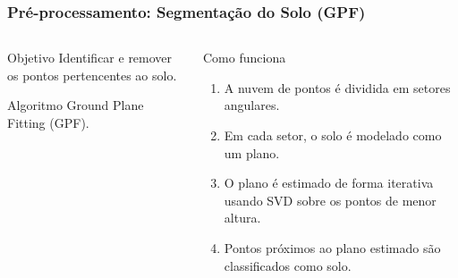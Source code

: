 \documentclass[aspectratio=169,t,xcolor=table]{beamer}
\begin{document}
\begin{frame}
    \frametitle{Pré-processamento: Segmentação do Solo (GPF)}
    \begin{columns}[T]
        \begin{column}{.4\textwidth}
            \begin{block}{Objetivo}
                \vspace{1.5em}
                Identificar e remover os pontos pertencentes ao solo.
                \vspace{1.5em}
            \end{block}
            \begin{block}{Algoritmo}
                \vspace{1.5em}
                Ground Plane Fitting (GPF).
                \vspace{1.5em}
            \end{block}
        \end{column}
        \begin{column}{.6\textwidth}
            \begin{block}{Como funciona}
                \begin{enumerate}[<+->]
                    \item A nuvem de pontos é dividida em setores angulares.
                    \item Em cada setor, o solo é modelado como um plano.
                    \item O plano é estimado de forma iterativa usando SVD sobre os pontos de menor altura.
                    \item Pontos próximos ao plano estimado são classificados como solo.
                \end{enumerate}
            \end{block}
        \end{column}
    \end{columns}
\end{frame}
\end{document}
